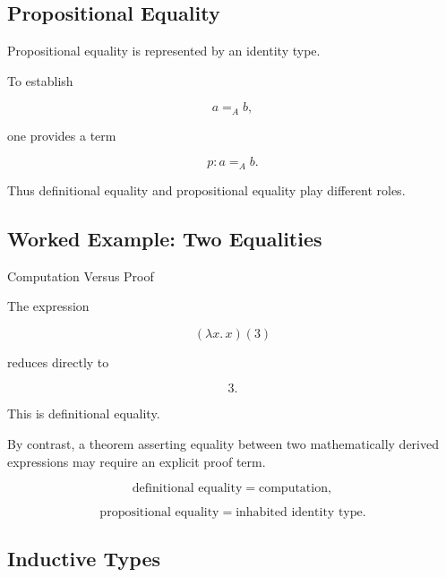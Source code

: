\subsection{Propositional Equality}
\label{subsec:propositional-equality}

Propositional equality is represented by an identity type.

To establish

\[
a=_A b,
\]

one provides a term

\[
\boxed{
p:a=_A b.
}
\]

Thus definitional equality and propositional equality play different roles.

\subsection{Worked Example: Two Equalities}
\label{subsec:worked-two-equalities}

\begin{workedexamplebox}{Computation Versus Proof}

The expression

\[
(\lambda x.\,x)(3)
\]

reduces directly to

\[
3.
\]

This is definitional equality.

By contrast, a theorem asserting equality between two mathematically
derived expressions may require an explicit proof term.

\begin{answerbox}
\[
\boxed{
\text{definitional equality}
=
\text{computation},
}
\]

\[
\boxed{
\text{propositional equality}
=
\text{inhabited identity type}.
}
\]
\end{answerbox}

\end{workedexamplebox}

\subsection{Inductive Types}
\label{subsec:inductive-types}

